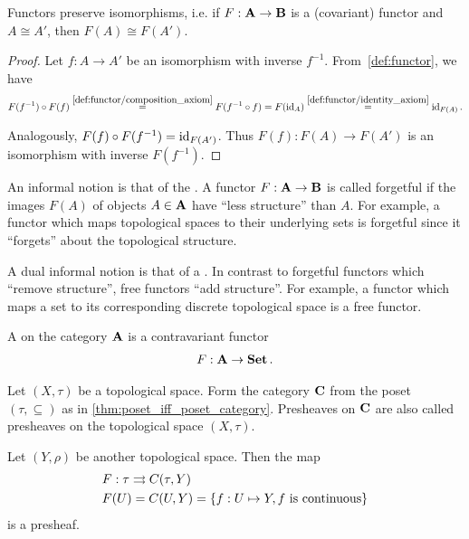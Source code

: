 \begin{proposition}\label{thm:functors_preserve_isomorphisms}\cite[exercise 1.2.21]{Leinster2014}
  Functors preserve isomorphisms, i.e. if $F: \operatorname{\mathbf{A}} \to \operatorname{\mathbf{B}}$ is a (covariant) functor and $A \cong A'$, then $F(A) \cong F(A')$.
\end{proposition}
\begin{proof}
  Let $f: A \to A'$ be an isomorphism with inverse $f^{-1}$. From~\cref{def:functor}, we have
  \begin{align*}
    F(f^{-1}) \circ F(f)
    \overset{\ref{def:functor/composition_axiom}} =
    F(f^{-1} \circ f)
    =
    F(\operatorname{id}_A)
    \overset{\ref{def:functor/identity_axiom}} =
    \operatorname{id}_{F(A)}.
  \end{align*}

  Analogously, $F(f) \circ F(f^{-1}) = \operatorname{id}_{F(A')}$. Thus $F(f): F(A) \to F(A')$ is an isomorphism with inverse $F(f^{-1})$.
\end{proof}

\begin{note}\label{note:forgetful_free_functor}\cite[examples 1.2.3, 1.2.4]{Leinster2014}
  An informal notion is that of the . A functor $F: \operatorname{\mathbf{A}} \to \operatorname{\mathbf{B}}$ is called forgetful if the images $F(A)$ of objects $A \in \operatorname{\mathbf{A}}$ have \enquote{less structure} than $A$. For example, a functor which maps topological spaces to their underlying sets is forgetful since it \enquote{forgets} about the topological structure.

  A dual informal notion is that of a . In contrast to forgetful functors which \enquote{remove structure}, free functors \enquote{add structure}. For example, a functor which maps a set to its corresponding discrete topological space is a free functor.
\end{note}

\begin{definition}\label{def:presheaf}\cite[definition 1.2.15]{Leinster2014}
  A  on the category $\operatorname{\mathbf{A}}$ is a contravariant functor
  \begin{align*}
    F: \operatorname{\mathbf{A}} \to \operatorname{\mathbf{Set}}.
  \end{align*}
\end{definition}

\begin{example}\label{ex:topological_space_presheaf}\cite[24]{Leinster2014}
  Let $(X, \tau)$ be a topological space. Form the category $\operatorname{\mathbf{C}}$ from the poset $(\tau, \subseteq)$ as in \cref{thm:poset_iff_poset_category}. Presheaves on $\operatorname{\mathbf{C}}$ are also called presheaves on the topological space $(X, \tau)$.

  Let $(Y, \rho)$ be another topological space. Then the map
  \begin{align*}
    &F: \tau \rightrightarrows C(\tau, Y) \\
    &F(U) = C(U, Y) = \{ f: U \mapsto Y, f \text{ is continuous} \}
  \end{align*}
  is a presheaf.
\end{example}


